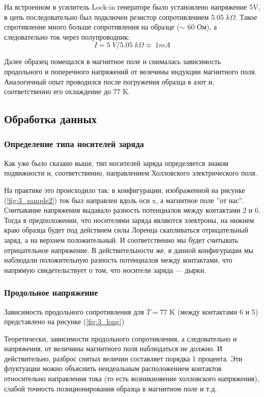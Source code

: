\documentclass[a4paper, 12pt]{article}
\begin{document}
На встроенном в усилитель Lock-in генераторе было установлено напряжение 5V, в цепь последовательно был подключен резистор сопротивлением 5.05 $k\Omega$. Такое спротивление много больше сопротивления на образце ($\sim$ 60 Ом), а следовательно ток через полупроводник: $$I=5 \;V/5.05 \; k\Omega\approx \;1mA$$

Далее образец помещался в магнитное поле и снималась зависимость продольного и поперечного напряжений от велечины индукции магнитного поля. Аналогичный опыт проводился после погружения образца в азот и, соответственно его охлаждение до 77 K.

\subsection{Обработка данных}
\subsubsection{Определение типа носителей заряда}
Как уже было сказано выше, тип носителей заряда определяется знаком подвижности и, соответственно, направлением Холловского электрического поля. 

На практике это происходило так: в конфигурации, изображенной на рисунке (\ref{fig:3_sample2}) ток был направлен вдоль оси x, а магнитное поле ''от нас''. Считывание напряжения выдавало разность потенциалов между контактами 2 и 6. Тогда в предположении, что носителями заряда являются электроны, на нижнем краю образца будет под действием силы Лоренца скапливаться отрицательный заряд, а на верхнем положительный. И соответственно мы будет считывать отрицательное напряжение. В действительности же, в данной конфигурации мы наблюдали положительную разность потенциалов между контактами, что напрямую свидетельствует о том, что носители заряда --- дырки.
\subsubsection{Продольное напряжение}

Зависимость продольного сопротивления для $T=77$ K (между контактами 6 и 5) представлено на рисунке (\ref{fig:3_long})

Теоретически, зависимости продольного сопротивления, а следовательно и напряжения, от величины магнитного поля наблюдаться не должно. И действительно, разброс снятых величин составляет порядка 1 процента. Эти флуктуации можно объяснить неидеальным расположением контактов относительно направления тока (то есть возникновение холловского напряжения), слабой точность позиционирования образца в магнитном поле и т.д. 
\end{document}

